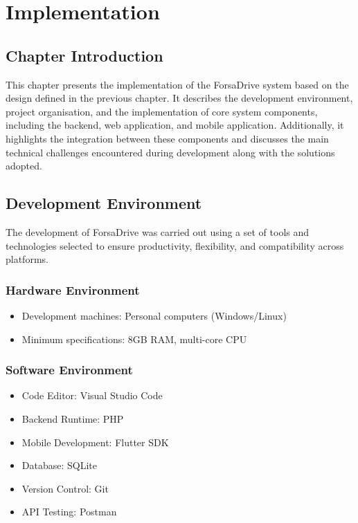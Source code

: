 \chapter{Implementation}

\section*{Chapter Introduction}

This chapter presents the implementation of the ForsaDrive system based on the design defined in the previous chapter. It describes the development environment, project organisation, and the implementation of core system components, including the backend, web application, and mobile application. Additionally, it highlights the integration between these components and discusses the main technical challenges encountered during development along with the solutions adopted.

\section{Development Environment}

The development of ForsaDrive was carried out using a set of tools and technologies selected to ensure productivity, flexibility, and compatibility across platforms.

\subsection{Hardware Environment}

\begin{itemize}[noitemsep]
    \item Development machines: Personal computers (Windows/Linux)
    \item Minimum specifications: 8GB RAM, multi-core CPU
\end{itemize}

\subsection{Software Environment}

\begin{itemize}[noitemsep]
    \item Code Editor: Visual Studio Code
    \item Backend Runtime: PHP
    \item Mobile Development: Flutter SDK
    \item Database: SQLite
    \item Version Control: Git
    \item API Testing: Postman
\end{itemize}

